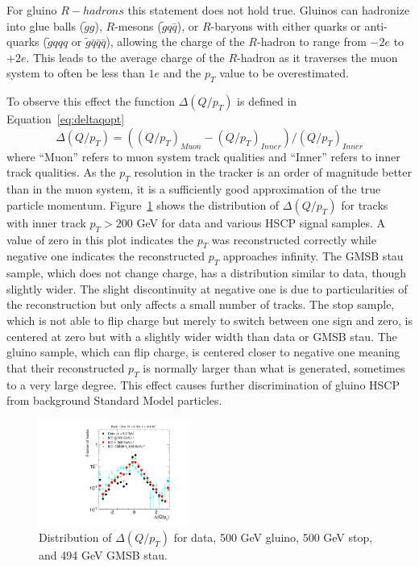 For gluino $R-hadrons$ this statement does not hold true. Gluinos can hadronize into glue balls ($\tilde{g}g$), $R$-mesons ($\tilde{g} q \bar{q}$), or
$R$-baryons  with either quarks or anti-quarks ($\tilde{g} qqq$ or $\tilde{g} \bar{q}\bar{q}\bar{q}$),
allowing the charge of the $R$-hadron to range from $-2e$ to $+2e$. This leads to the
average charge of the $R$-hadron as it traverses the muon system to often be less than $1e$ and the $p_T$ value to be overestimated.

To observe this effect the function
$\Delta(Q/p_T)$ is defined in Equation~\ref{eq:deltaqopt}
\begin{equation}
\Delta(Q/p_T) = ((Q/p_T)_{Muon} - (Q/p_T)_{Inner})/(Q/p_T)_{Inner}
\label{eq:deltaqopt}
\end{equation}
where ``Muon'' refers to muon system track qualities and ``Inner'' refers to
inner track qualities. As the $p_T$ resolution in the tracker is an order of magnitude better than in the muon system, it is a sufficiently good approximation
of the true particle momentum. Figure~\ref{fig:MuOnlyInvPtDiff} shows the distribution of
$\Delta(Q/p_T)$ for tracks with inner track $p_T > 200$ GeV
for data and various HSCP signal samples.
A value of zero in this plot indicates the $p_T$ was reconstructed correctly
while negative one indicates the reconstructed $p_T$ approaches infinity.
The GMSB stau sample, which does not change charge,
has a distribution similar to data, though slightly wider.
The slight discontinuity at negative one is due to particularities of the reconstruction but only affects a small number of tracks.
The stop sample, which is not able to flip charge but merely to switch
between one sign and zero, is centered at zero but with a slightly wider
width than data or GMSB stau.
The gluino sample, which can flip charge, is centered closer to negative one meaning that
their reconstructed $p_T$ is normally larger than what is generated, sometimes
to a very large degree.  This effect causes further discrimination of gluino HSCP
from background Standard Model particles.

\begin{figure}
 \begin{center}
  \includegraphics[width=0.44\textwidth]{figures/muonly/Selection_Comp_Signal_8TeV_InnerInvPtDiff_BS}
 \end{center}
 \caption{Distribution of $\Delta(Q/p_T)$
    for data, 500 GeV gluino, 500 GeV stop, and 494 GeV GMSB stau.
    \label{fig:MuOnlyInvPtDiff}}
\end{figure}

